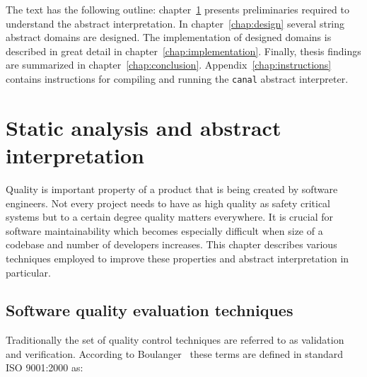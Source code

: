 \documentclass[12pt,final,oneside]{fithesis2}
\begin{document}
The text has the following outline: chapter~\ref{chap:preliminaries}
presents preliminaries required to understand the abstract interpretation.
In chapter~\ref{chap:design} several string abstract domains are designed.
The implementation of designed domains is described in great detail in
chapter~\ref{chap:implementation}. Finally, thesis findings are summarized
in chapter~\ref{chap:conclusion}. Appendix~\ref{chap:instructions} contains
instructions for compiling and running the \texttt{canal} abstract
interpreter.


\chapter{Static analysis and abstract interpretation}
\label{chap:preliminaries}

Quality is important property of a product that is being created by
software engineers. Not every project needs to have as high quality as
safety critical systems but to a certain degree quality matters
everywhere. It is crucial for software maintainability which becomes
especially difficult when size of a codebase and number of developers
increases. This chapter describes various techniques employed to
improve these properties and abstract interpretation in particular.


\section{Software quality evaluation techniques}

Traditionally the set of quality control techniques are referred to as
validation and verification. According to
Boulanger~\cite{Boulanger12-1} these terms are defined in standard
ISO 9001:2000 as:
\end{document}
